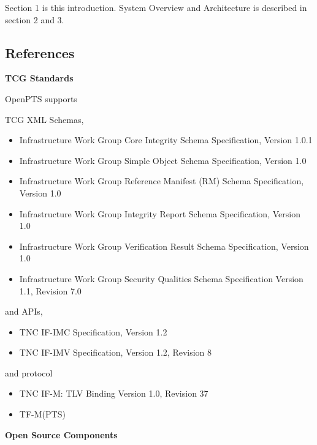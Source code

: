 \documentclass[12pt,a4paper]{article}
\begin{document}
Section 1 is this introduction.
System Overview and Architecture is described in section 2 and 3.


\subsection{References} 

{\bf TCG Standards}

OpenPTS supports 

TCG XML Schemas, 

\begin{itemize}
\item Infrastructure Work Group Core Integrity Schema Specification, Version 1.0.1\cite{core_integrity_schema}
\item Infrastructure Work Group Simple Object Schema Specification, Version 1.0\cite{simple_object_schema}
\item Infrastructure Work Group Reference Manifest (RM) Schema Specification, Version 1.0\cite{rm_schema}
\item Infrastructure Work Group Integrity Report Schema Specification, Version 1.0\cite{integrity_report_schema}
\item Infrastructure Work Group Verification Result Schema Specification, Version 1.0\cite{verification_result_schema}
\item Infrastructure Work Group Security Qualities Schema Specification Version 1.1, Revision 7.0\cite{qualities_schema}
\end{itemize}

and APIs, 

\begin{itemize}
\item TNC IF-IMC Specification, Version 1.2\cite{ifimc}
\item TNC IF-IMV Specification, Version 1.2, Revision 8\cite{ifimv}
\end{itemize}

and protocol

\begin{itemize}
\item TNC IF-M: TLV Binding Version 1.0, Revision 37\cite{ifmtlv}
\item TF-M(PTS)\cite{ifmpts}
\end{itemize}


{\bf Open Source Components}
\end{document}

